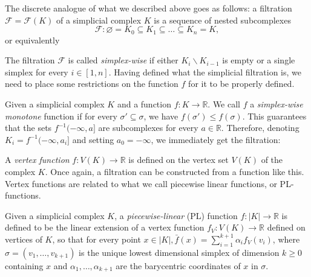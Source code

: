   The discrete analogue of what we described above goes as follows: a filtration $\mathcal{F} = \mathcal{F}(K)$ of a simplicial complex $K$ is a sequence of nested subcomplexes
  \begin{equation*}
    \mathcal{F} : \varnothing = K_{0} \subseteq K_{1} \subseteq \ldots \subseteq K_{n} = K,
  \end{equation*}
  or equivalently

  \begin{figure}[h!]
    \centering
  \end{figure}

  The filtration $\mathcal{F}$ is called \textit{simplex-wise} if either $K_{i} \backslash K_{i-1}$ is empty or a single simplex for every $i \in [1,n]$. Having defined what the simplicial filtration is, we need to place some restrictions on the function $f$ for it to be properly defined.

  \par
  Given a simplicial complex $K$ and a function $f: K \to \mathbb{R}$. We call $f$ a \textit{simplex-wise monotone} function if for every $\sigma' \subseteq \sigma$, we have $f(\sigma') \leq f(\sigma)$. This guarantees that the sets $f^{-1}(-\infty, a]$ are subcomplexes for every $a \in \mathbb{R}$. Therefore, denoting $K_{i} = f^{-1}(-\infty, a_{i}]$ and setting $a_{0} = -\infty$, we immediately get the filtration:

      \begin{figure}[h!]
        \centering
      \end{figure}

      A \textit{vertex function} $f:V(K) \to \mathbb{R}$ is defined on the vertex set $V(K)$ of the complex $K$. Once again, a filtration can be constructed from a function like this. Vertex functions are related to what we call piecewise linear functions, or PL-functions.

      \begin{definition}[PL-functions]
        Given a simplicial complex $K$, a \textit{piecewise-linear} (PL) function $f: |K| \to \mathbb{R}$ is defined to be the linear extension of a vertex function $f_{V}: V(K) \to \mathbb{R}$ defined on vertices of $K$, so that for every point $x \in |K|, \bar{f}(x) = \sum_{i=1}^{k+1}\alpha_{i}f_{V}(v_{i})$, where $\sigma = (v_{1}, \ldots, v_{k+1})$ is the unique lowest dimensional simplex of dimension $k\geq 0$ containing $x$ and $\alpha_{1}, \ldots, \alpha_{k+1}$ are the barycentric coordinates of $x$ in $\sigma$.
      \end{definition}

